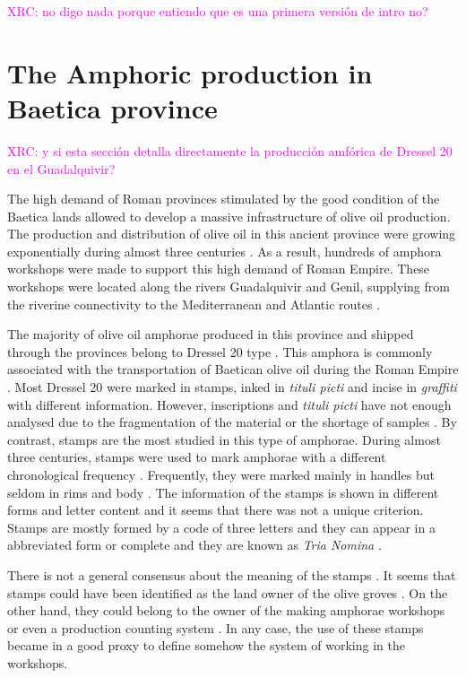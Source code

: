 \documentclass[review]{elsarticle}
\newcommand{\memo}[2]{\textcolor{#1}{#2}}
\newcommand{\xavi}[1]{\memo{magenta}{XRC: #1\\}}
\begin{document}

\xavi{no digo nada porque entiendo que es una primera versión de intro no?}

\section{The Amphoric production in Baetica province}

\xavi{y si esta sección detalla directamente la producción amfórica de Dressel 20 en el Guadalquivir?}

The high demand of Roman provinces stimulated by the good condition of the Baetica lands allowed to develop a massive infrastructure of olive oil production. The production and distribution of olive oil in this ancient province were growing exponentially during almost three centuries \citep{remesal_concierto}. As a result, hundreds of amphora workshops were made to support this high demand of Roman Empire. These workshops were located along the rivers Guadalquivir and Genil, supplying from the riverine connectivity to the Mediterranean and Atlantic routes \citep{garcia_vargas_enrique_formal_2010}.

The majority of olive oil amphorae produced in this province and shipped through the provinces belong to Dressel 20 type \citep{dressel,martin-kilcher_romischen_1994}. This amphora is commonly associated with the transportation of Baetican olive oil during the Roman Empire \citep{berni_millet_epigrafianforica_2008}. Most Dressel 20 were marked in stamps, inked in \textit{tituli picti} and incise in \textit{graffiti} with different information. However, inscriptions and \textit{tituli picti} have not enough analysed due to the fragmentation of the material or the shortage of samples \citep{aguilera_evolucion_2007,rovira_guardiola_grafitos_2007}. By contrast, stamps are the most studied in this type of amphorae. During almost three centuries, stamps were used to mark amphorae with a different chronological frequency \citep{remesal_sellar_2016}. Frequently, they were marked mainly in handles but seldom in rims and body \citep{millet_anforas_1998}. 
The information of the stamps is shown in different forms and letter content and it seems that there was not a unique criterion. Stamps are mostly formed by a code of three letters and they can appear in a abbreviated form or complete and they are known as \textit{Tria Nomina} \citep{berni_millet_amphora_1996}. 

 There is not a general consensus about the meaning of the stamps \citep{rodriguez_baetican_1998}. It seems that stamps could have been identified as the land owner of the olive groves \citep{rodriguez_economioleicola_1977}. On the other hand, they could belong to the owner of the making amphorae workshops or even a production counting system  \citep{berni_millet_epigrafianforica_2008}. In any case, the use of these stamps became in a good proxy to define somehow the system of working in the workshops. 
\end{document}

